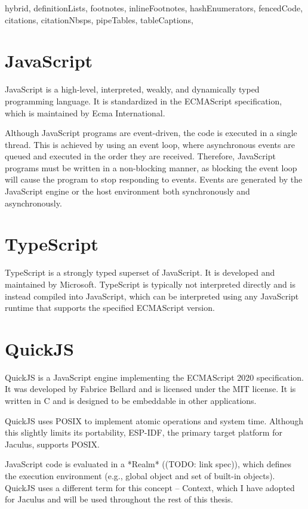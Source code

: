 \begin{markdown*}{%
  hybrid,
  definitionLists,
  footnotes,
  inlineFootnotes,
  hashEnumerators,
  fencedCode,
  citations,
  citationNbsps,
  pipeTables,
  tableCaptions,
}
\section{JavaScript}

JavaScript is a high-level, interpreted, weakly, and dynamically typed programming language. It is standardized in the ECMAScript specification, which is maintained by Ecma International.

Although JavaScript programs are event-driven, the code is executed in a single thread. This is achieved by using an event loop, where asynchronous events are queued and executed in the order they are received. Therefore, JavaScript programs must be written in a non-blocking manner, as blocking the event loop will cause the program to stop responding to events. Events are generated by the JavaScript engine or the host environment both synchronously and asynchronously.

\section{TypeScript}

TypeScript is a strongly typed superset of JavaScript. It is developed and maintained by Microsoft. TypeScript is typically not interpreted directly and is instead compiled into JavaScript, which can be interpreted using any JavaScript runtime that supports the specified ECMAScript version.

\section{QuickJS}

QuickJS is a JavaScript engine implementing the ECMAScript 2020 specification. It was developed by Fabrice Bellard and is licensed under the MIT license. It is written in C and is designed to be embeddable in other applications.

QuickJS uses POSIX to implement atomic operations and system time. Although this slightly limits its portability, ESP-IDF, the primary target platform for Jaculus, supports POSIX.

JavaScript code is evaluated in a *Realm* ((TODO: link spec)), which defines the execution environment (e.g., global object and set of built-in objects). QuickJS uses a different term for this concept -- Context, which I have adopted for Jaculus and will be used throughout the rest of this thesis.


\end{markdown*}
